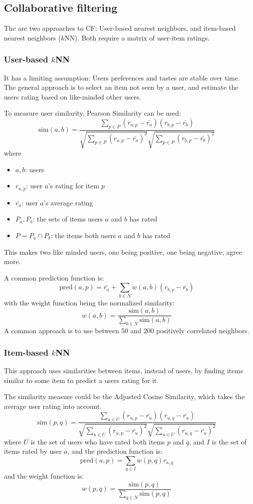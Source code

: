 \subsection{Collaborative filtering}
The are two approaches to CF: User-based nearest neighbors, and item-based nearest neighbors ($k$NN).
Both require a matrix of user-item ratings.

\subsubsection{User-based $k$NN}
It has a limiting assumption: Users preferences and tastes are stable over time.
The general approach is to select an item not seen by a user, and estimate the users rating based on like-minded other users.

To measure user similarity, Pearson Similarity can be used:
\[
    \mathrm{sim}(a, b) = \frac{\sum_{p \in P}(r_{a, p} - \bar{r_a})(r_{b, p} - \bar{r_b})}{\sqrt{\sum_{p \in P}(r_{a, p} - \bar{r_a})^2}\sqrt{\sum_{p \in P}(r_{b, p} - \bar{r_b})^2}}
\]
where
\begin{itemize}
    \item $a, b$: users
    \item $r_{a, p}$: user $a$'s rating for item $p$
    \item $\bar{r_a}$: user $a$'s average rating
    \item $P_a, P_b$: the sets of items users $a$ and $b$ has rated
    \item $P = P_a \cap P_b$: the items both users $a$ and $b$ has rated
\end{itemize}
This makes two like minded users, one being positive, one being negative, agree more.

A common prediction function is:
\[
    \mathrm{pred}(a, p) = \bar{r_a} + \sum_{b \in N}w(a, b)(r_{b, p} - \bar{r_b})
\]
with the weight function being the normalized similarity:
\[
    w(a, b) = \frac{\mathrm{sim}(a, b)}{\sum_{b \in N}\mathrm{sim}(a, b)}
\]
A common approach is to use between 50 and 200 positively correlated neighbors.

\subsubsection{Item-based $k$NN}
This approach uses similarities between items, instead of users, by finding items similar to some item to predict a users rating for it.

The similarity measure could be the Adjusted Cosine Similarity, which takes the average user rating into account.
\[
    \mathrm{sim}(p, q) = \frac{\sum_{u \in U}(r_{u, p} - \bar{r_u})(r_{u, q} - \bar{r_u})}{\sqrt{\sum_{u \in U}(r_{u, p} - \bar{r_u})^2}\sqrt{\sum_{u \in U}(r_{u, q} - \bar{r_u})^2}}
\]
where $U$ is the set of users who have rated both items $p$ and $q$, and $I$ is the set of items rated by user $a$, and the prediction function is:
\[
    \mathrm{pred}(a, p) = \sum_{q \in I}w(p, q)r_{a, q}
\]
and the weight function is:
\[
    w(p, q) = \frac{\mathrm{sim}(p, q)}{\sum_{q \in N}\mathrm{sim}(p, q)}
\]

